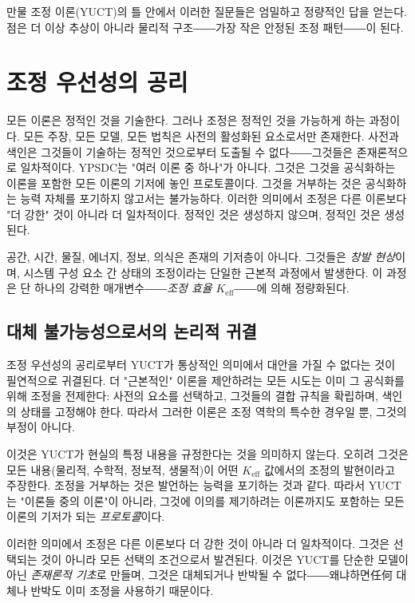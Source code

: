 \documentclass[12pt,a4paper]{article}
\newcommand{\Keff}{K_{\mathrm{eff}}}
\begin{document}
	만물 조정 이론(YUCT)의 틀 안에서 이러한 질문들은 엄밀하고 정량적인 답을 얻는다. 점은 더 이상 추상이 아니라 물리적 구조――가장 작은 안정된 조정 패턴――이 된다.
	
	\section*{조정 우선성의 공리}
	
	모든 이론은 정적인 것을 기술한다. 그러나 조정은 정적인 것을 가능하게 하는 과정이다. 모든 주장, 모든 모델, 모든 법칙은 사전의 활성화된 요소로서만 존재한다. 사전과 색인은 그것들이 기술하는 정적인 것으로부터 도출될 수 없다――그것들은 존재론적으로 일차적이다. YPSDC는 "여러 이론 중 하나"가 아니다. 그것은 그것을 공식화하는 이론을 포함한 모든 이론의 기저에 놓인 프로토콜이다. 그것을 거부하는 것은 공식화하는 능력 자체를 포기하지 않고서는 불가능하다. 이러한 의미에서 조정은 다른 이론보다 "더 강한" 것이 아니라 더 일차적이다. 정적인 것은 생성하지 않으며, 정적인 것은 생성된다.
	
	공간, 시간, 물질, 에너지, 정보, 의식은 존재의 기저층이 아니다. 그것들은 \emph{창발 현상}이며, 시스템 구성 요소 간 상태의 조정이라는 단일한 근본적 과정에서 발생한다. 이 과정은 단 하나의 강력한 매개변수――\emph{조정 효율} \(\Keff\)――에 의해 정량화된다.
	
	\subsection*{대체 불가능성으로서의 논리적 귀결}
	
	조정 우선성의 공리로부터 YUCT가 통상적인 의미에서 대안을 가질 수 없다는 것이 필연적으로 귀결된다. 더 "근본적인" 이론을 제안하려는 모든 시도는 이미 그 공식화를 위해 조정을 전제한다: 사전의 요소를 선택하고, 그것들의 결합 규칙을 확립하며, 색인의 상태를 고정해야 한다. 따라서 그러한 이론은 조정 역학의 특수한 경우일 뿐, 그것의 부정이 아니다.
	
	이것은 YUCT가 현실의 특정 내용을 규정한다는 것을 의미하지 않는다. 오히려 그것은 모든 내용(물리적, 수학적, 정보적, 생물적)이 어떤 \(\Keff\) 값에서의 조정의 발현이라고 주장한다. 조정을 거부하는 것은 발언하는 능력을 포기하는 것과 같다. 따라서 YUCT는 "이론들 중의 이론"이 아니라, 그것에 이의를 제기하려는 이론까지도 포함하는 모든 이론의 기저가 되는 \emph{프로토콜}이다.
	
	이러한 의미에서 조정은 다른 이론보다 더 강한 것이 아니라 더 일차적이다. 그것은 선택되는 것이 아니라 모든 선택의 조건으로서 발견된다. 이것은 YUCT를 단순한 모델이 아닌 \emph{존재론적 기초}로 만들며, 그것은 대체되거나 반박될 수 없다――왜냐하면任何 대체나 반박도 이미 조정을 사용하기 때문이다.
	
\end{document}
